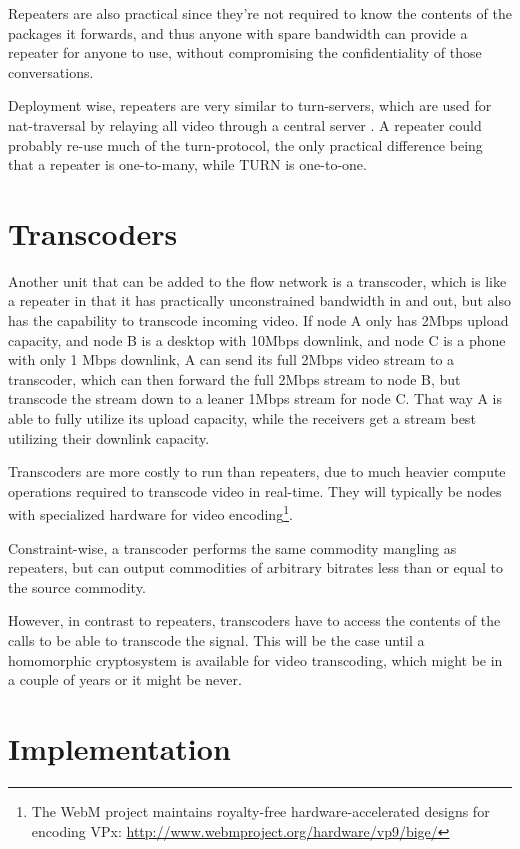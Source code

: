 Repeaters are also practical since they're not required to know the contents of the packages it forwards, and thus anyone with spare bandwidth can provide a repeater for anyone to use, without compromising the confidentiality of those conversations.

Deployment wise, repeaters are very similar to \gls{turn}-servers, which are used for \gls{nat}-traversal by relaying all video through a central server \cite{rfc5766}. A repeater could probably re-use much of the \gls{turn}-protocol, the only practical difference being that a repeater is one-to-many, while TURN is one-to-one.


\section{Transcoders}

Another unit that can be added to the flow network is a transcoder, which is like a repeater in that it has practically unconstrained bandwidth in and out, but also has the capability to transcode incoming video. If node A only has 2Mbps upload capacity, and node B is a desktop with 10Mbps downlink, and node C is a phone with only 1 Mbps downlink, A can send its full 2Mbps video stream to a transcoder, which can then forward the full 2Mbps stream to node B, but transcode the stream down to a leaner 1Mbps stream for node C. That way A is able to fully utilize its upload capacity, while the receivers get a stream best utilizing their downlink capacity.

Transcoders are more costly to run than repeaters, due to much heavier compute operations required to transcode video in real-time. They will typically be nodes with specialized hardware for video encoding\footnote{The WebM project maintains royalty-free hardware-accelerated designs for encoding VPx: \url{http://www.webmproject.org/hardware/vp9/bige/}}.

Constraint-wise, a transcoder performs the same commodity mangling as repeaters, but can output commodities of arbitrary bitrates less than or equal to the source commodity.

However, in contrast to repeaters, transcoders have to access the contents of the calls to be able to transcode the signal. This will be the case until a homomorphic cryptosystem is available for video transcoding, which might be in a couple of years or it might be never.


\section{Implementation}\label{sec:implementation}

